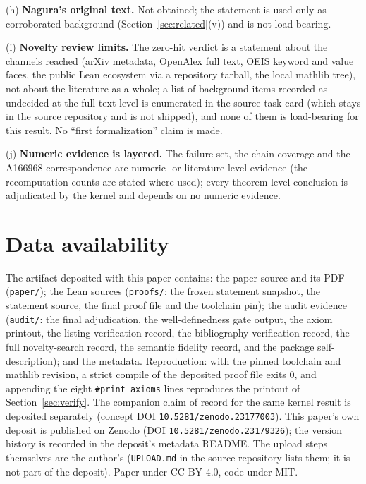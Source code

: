 \documentclass[11pt]{article}
\theoremstyle{definition}
\begin{document}
(h) \textbf{Nagura's original text.} Not obtained; the statement is used only
as corroborated background (Section~\ref{sec:related}(v)) and is not
load-bearing.

(i) \textbf{Novelty review limits.} The zero-hit verdict is a statement about
the channels reached (arXiv metadata, OpenAlex full text, OEIS keyword and
value faces, the public Lean ecosystem via a repository tarball, the local
mathlib tree), not about the literature as a whole; a list of background
items recorded as undecided at the full-text level is enumerated in the
source task card (which stays in the source repository and is not shipped),
and none of them is load-bearing for this result. No ``first formalization''
claim is made.

(j) \textbf{Numeric evidence is layered.} The failure set, the chain
coverage and the A166968 correspondence are numeric- or literature-level
evidence (the recomputation counts are stated where used); every
theorem-level conclusion is adjudicated by the kernel and depends on no
numeric evidence.

\section*{Data availability}

The artifact deposited with this paper contains: the paper source and its PDF
(\texttt{paper/}); the Lean sources (\texttt{proofs/}: the frozen statement
snapshot, the statement source, the final proof file and the toolchain pin);
the audit evidence (\texttt{audit/}: the final adjudication, the
well-definedness gate output, the axiom printout, the listing verification
record, the bibliography verification record, the full novelty-search record, the
semantic fidelity record, and the package self-description); and the
metadata. Reproduction: with the pinned toolchain and mathlib revision, a
strict compile of the deposited proof file exits $0$, and appending the eight
\texttt{\#print axioms} lines reproduces the printout of
Section~\ref{sec:verify}. The companion claim of record for the same kernel
result is deposited separately \cite{claimdeposit} (concept DOI
\texttt{10.5281/zenodo.23177003}). This paper's own deposit is published on
Zenodo (DOI \texttt{10.5281/zenodo.23179326}); the version history is
recorded in the deposit's metadata README. The upload steps themselves are
the author's (\texttt{UPLOAD.md} in the source repository lists them; it is
not part of the deposit). Paper under CC BY 4.0, code under MIT.
\end{document}
